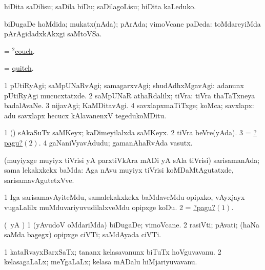\noindent
\gl{\pagu}
\bmng
{} hiDita saDilisu; saDila biDu; saDilagoLisu; hiDita kaLeduko. 
\emng
\eentry

\bentry
{}
\gl{\Agu}
\bmng
biDugaDe hoMdida; mukatx(nAda); pArAda; vimoVcane paDeda:  toMdareyiMda pArAgidadxkAkxgi saMtoVSa. 
\emng
\eentry

\bentry
{}
\gl{\nA}
\bmng
= \hyperref{kandict_c.pdf}{C}{couch(2)}{$^2$couch}. 
\emng
\eentry

\bentry
{}
\gl{\nA}
\bmng
= \hyperlink{quitch}{quitch}. 
\emng
\eentry

\bentry
{}
\gl{\kirxvi}
\bmng
\bnum
\num{1} pUtiRyAgi; saMpUNaRvAgi; samagarxvAgi; shudAdhxMgavAgi:  adanunx pUtiRyAgi mucucxtatxde. 
\num{2} saMpUNaR athaRdalilx; tiVra:  tiVra thaTaTxneya badalAvaNe. 
\num{3} nijavAgi; KaMDitavAgi. 
\num{4} savxlapxmaTiTxge; koMca; savxlapx:  adu savxlapx hecucx kAlavanenxV tegedukoMDitu. 
\enum
\emng

\noindent
\gl{\pagu}
\bmng
\bnum
\num{1}  (\AmA) sAkaSuTx saMKeyx; kaDimeyilalxda saMKeyx. 
\hypertarget{quite pagu2}{} 
\num{2}  tiVra beVre(yAda). 
\num{3}  = \hyperlink{quite pagu2}{?pagu?\((2)\)}. 
\num{4}  gaNaniVyavAdudu; gamanAhaRvAda vasutx. 
\enum
\emng
\eentry

\bentry
{}
\gl{\Agu}
\bmng
(muyiyxge muyiyx tiVrisi yA parxtiVkAra mADi yA sAla tiVrisi) sarisamanAda; sama lekakxkekx baMda:   Aga nAvu muyiyx tiVrisi koMDaMtAgutatxde, sarisamavAgutetxVve. 
\emng

\noindent
\gl{\pagu}
\bmng
\hypertarget{quits pagu1}{} 
\bnum
\num{1}   Iga sarisamavAyiteMdu, samalekakxkekx baMdaveMdu opipxko, vAyxjayx \mo vugaLalilx muMduvariyuvudilalxveMdu opipxge koDu. 
\num{2}  = \hyperlink{quits pagu1}{?pagu?\((1)\)}. 
\enum
\emng
\eentry

\bentry
{}
\gl{\nA}
\expl{}
\bmng
(\pArxparx\ yA \kAparx) 
\bnum
\num{1} (yAvudoV oMdariMda) biDugaDe; vimoVcane. 
\num{2} rasiVti; pAvati; (haNa saMda bagegx) opipxge ciVTi; saMdAyada ciVTi. 
\enum
\emng
\eentry

\bentry
{}
\gl{\nA}
\bmng
\bnum
\num{1} kataRvayxBarxSaTx; tananx kelasavanunx biTuTx hoVguvavanu. 
\num{2} kelasagaLaLx; meYgaLaLx; kelasa mADalu hiMjariyuvavanu. 
\enum
\emng
\eentry

